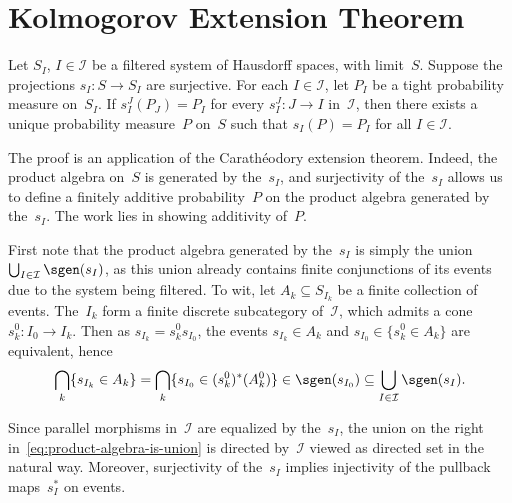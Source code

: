 \chapter	{Kolmogorov Extension Theorem}

\begin	{theorem}	
Let $S_I$, \( I \in \mathcal I \) be a filtered system of Hausdorff spaces,
with limit~$S$.
Suppose the projections \( s_I \colon S \to S_I \) are surjective.
For each \( I \in \mathcal I \), let $P_I$ be a tight probability measure
on~$S_I$.
If \( s_I^J(P_J) = P_I \) for every \( s_I^J \colon J \to I \) in~$\mathcal I$,
then there exists a unique probability measure~$P$ on~$S$ such that
\( s_I(P) = P_I \) for all \( I \in \mathcal I \).
\end	{theorem}
The proof is an application of the Carathéodory extension theorem.
Indeed, the product \sig algebra on~$S$ is generated by the~$s_I$,
and surjectivity of the~$s_I$ allows us to define a finitely additive
probability~$P$ on the product algebra generated by the~$s_I$.
The work lies in showing \sig additivity of~$P$.

First note that the product algebra generated by the~$s_I$
is simply the union
\( \bigcup_{I \in \mathcal I} \sgen(s_I) \),
as this union already contains finite conjunctions of its events
due to the system being filtered.
To wit, let \( A_k \subseteq S_{I_k} \) be a finite collection of events.
The~$I_k$ form a finite discrete subcategory of~$\mathcal I$,
which admits a cone \( s_k^0 \colon I_0 \to I_k \).
Then as \( s_{I_k} = s_k^0 s_{I_0} \),
the events \( s_{I_k} \in A_k \) and \( s_{I_0} \in \{s_k^0 \in A_k\} \)
are equivalent, hence
\begin	{equation}
\label	{eq:product-algebra-is-union}
	\bigcap_k \{s_{I_k} \in A_k\}
		= \bigcap_k \{s_{I_0} \in (s_k^0)^*(A_k^0)\}
		\in \sgen(s_{I_0})
		\subseteq \bigcup_{I \in \mathcal I} \sgen(s_I)
	\text.
\end	{equation}

Since parallel morphisms in~$\mathcal I$ are equalized by the~$s_I$,
the union on the right in~\eqref{eq:product-algebra-is-union}
is directed by~$\mathcal I$ viewed as directed set in the natural way.
Moreover, surjectivity of the~$s_I$ implies injectivity
of the pullback maps~$s_I^*$ on events.
